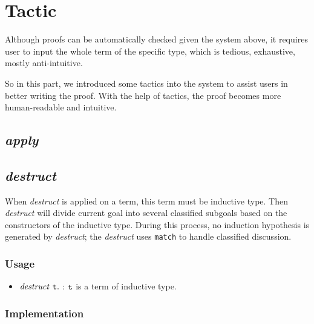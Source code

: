 \section{Tactic}
Although proofs can be automatically checked given the system above, it requires user to input the whole
term of the specific type, which is tedious, exhaustive, mostly anti-intuitive.\par
So in this part, we introduced some tactics into the system 
to assist users in better writing the proof. With the help of
tactics, the proof becomes more human-readable and intuitive.\par

\subsection{\it apply}

\subsection{\it destruct}

When {\it destruct} is applied on a term, this term must be inductive type. Then {\it destruct} will divide current goal
into several classified subgoals based on the constructors of the inductive type. During this process, no induction 
hypothesis is generated by {\it destruct}; the {\it destruct} uses {\tt match} to handle classified discussion.

\subsubsection*{Usage}
\begin{itemize}
\item ${\it destruct}\ \tt t.$ : $\tt t$ is a term of inductive type. 
\end{itemize}

\subsubsection*{Implementation}

